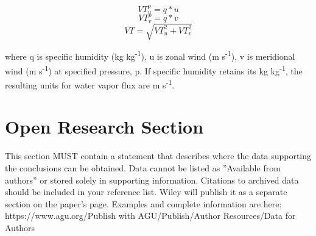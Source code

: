\documentclass[draft]{agujournal2019}
\begin{document}
\begin{equation}
VT_{u}^{p}   = q*u 
\end{equation}
\begin{equation}
VT_{v}^{p}   = q*v   
\end{equation}
\begin{equation}
VT = \sqrt{VT^{2}_{u} + VT^{2}_{v}}
\end{equation}

where q is specific humidity (kg kg\textsuperscript{-1}), u is zonal wind (m s\textsuperscript{-1}), v is meridional wind (m s\textsuperscript{-1}) at specified pressure, p. If specific humidity retains its kg kg\textsuperscript{-1}, the resulting units for water vapor flux are m s\textsuperscript{-1}. 

%








%
%

\section*{Open Research Section}
This section MUST contain a statement that describes where the data supporting the conclusions can be obtained. Data cannot be listed as ''Available from authors'' or stored solely in supporting information. Citations to archived data should be included in your reference list. Wiley will publish it as a separate section on the paper’s page. Examples and complete information are here:
https://www.agu.org/Publish with AGU/Publish/Author Resources/Data for Authors
\end{document}
